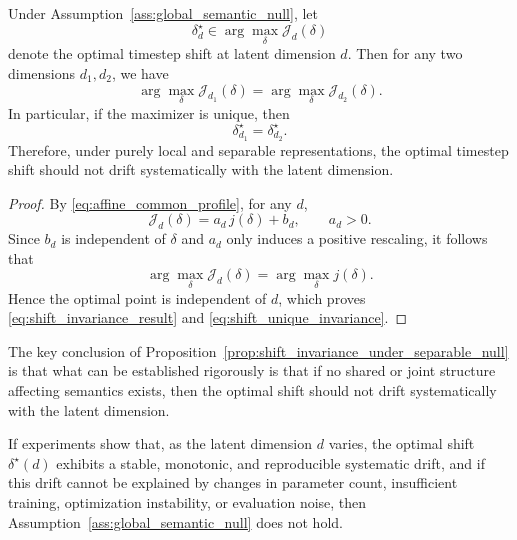 \begin{proposition}
\label{prop:shift_invariance_under_separable_null}
Under Assumption~\ref{ass:global_semantic_null}, let
\[
\delta_d^{\star}\in\arg\max_{\delta}\mathcal J_d(\delta)
\]
denote the optimal timestep shift at latent dimension $d$. Then for any two dimensions $d_1,d_2$, we have
\begin{equation}
\arg\max_{\delta}\mathcal J_{d_1}(\delta)
=
\arg\max_{\delta}\mathcal J_{d_2}(\delta).
\label{eq:shift_invariance_result}
\end{equation}
In particular, if the maximizer is unique, then
\begin{equation}
\delta_{d_1}^{\star}=\delta_{d_2}^{\star}.
\label{eq:shift_unique_invariance}
\end{equation}
Therefore, under purely local and separable representations, the optimal timestep shift should not drift systematically with the latent dimension.
\end{proposition}

\begin{proof}
By \eqref{eq:affine_common_profile}, for any $d$,
\[
\mathcal J_d(\delta)=a_d\,j(\delta)+b_d,
\qquad a_d>0.
\]
Since $b_d$ is independent of $\delta$ and $a_d$ only induces a positive rescaling, it follows that
\[
\arg\max_{\delta}\mathcal J_d(\delta)
=
\arg\max_{\delta}j(\delta).
\]
Hence the optimal point is independent of $d$, which proves \eqref{eq:shift_invariance_result} and \eqref{eq:shift_unique_invariance}.
\end{proof}

The key conclusion of Proposition~\ref{prop:shift_invariance_under_separable_null} is that what can be established rigorously is that if no shared or joint structure affecting semantics exists, then the optimal shift should not drift systematically with the latent dimension.

\begin{corollary}
\label{cor:drift_refutes_separable_null}
If experiments show that, as the latent dimension $d$ varies, the optimal shift $\delta^{\star}(d)$ exhibits a stable, monotonic, and reproducible systematic drift, and if this drift cannot be explained by changes in parameter count, insufficient training, optimization instability, or evaluation noise, then Assumption~\ref{ass:global_semantic_null} does not hold.
\end{corollary}


